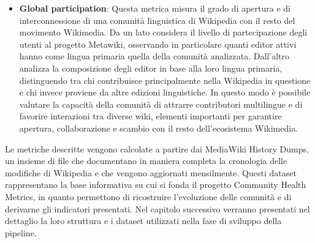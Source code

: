 \begin{itemize}
    \item \textbf{Global participation}: Questa metrica misura il grado di apertura e di interconnessione di una comunità linguistica di Wikipedia con il resto del movimento Wikimedia. Da un lato considera il livello di partecipazione degli utenti al progetto Metawiki, osservando in particolare quanti editor attivi hanno come lingua primaria quella della comunità analizzata. Dall’altro analizza la composizione degli editor in base alla loro lingua primaria, distinguendo tra chi contribuisce principalmente nella Wikipedia in questione e chi invece proviene da altre edizioni linguistiche. In questo modo è possibile valutare la capacità della comunità di attrarre contributori multilingue e di favorire interazioni tra diverse wiki, elementi importanti per garantire apertura, collaborazione e scambio con il resto dell’ecosistema Wikimedia.
\end{itemize}

Le metriche descritte vengono calcolate a partire dai MediaWiki History Dumps, un insieme di file che documentano in maniera completa la cronologia delle modifiche di Wikipedia e che vengono aggiornati mensilmente. Questi dataset rappresentano la base informativa su cui si fonda il progetto Community Health Metrics, in quanto permettono di ricostruire l’evoluzione delle comunità e di derivarne gli indicatori presentati. Nel capitolo successivo verranno presentati nel dettaglio la loro struttura e i dataset utilizzati nella fase di sviluppo della pipeline.
